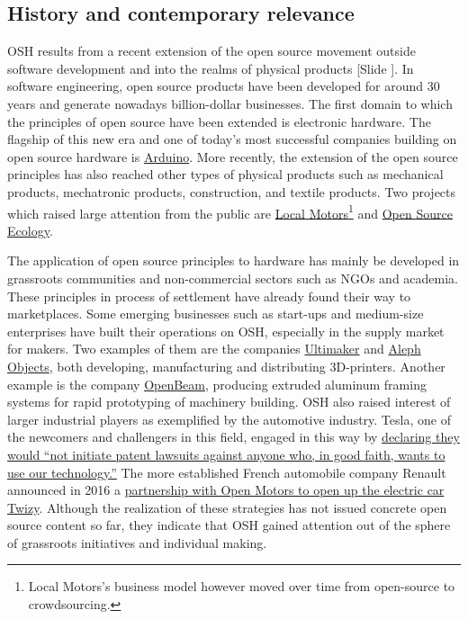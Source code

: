 \documentclass{article}
\newcounter{slide}
\begin{document}
\subsection{History and contemporary relevance}
\label{sec:OSHhistory}
OSH results from a recent extension of the open source movement outside software development and into the realms of physical products {\color{blue}[Slide ]}. In software engineering, open source products have been developed for around 30 years and generate nowadays billion-dollar businesses. The first domain to which the principles of open source have been extended is electronic hardware. The flagship of this new era and one of today's most successful companies building on open source hardware is \href{https://www.arduino.cc/}{Arduino}. More recently, the extension of the open source principles has also reached other types of physical products such as mechanical products, mechatronic products, construction, and textile products. Two projects which raised large attention from the public are \href{https://localmotors.com/}{Local Motors}\footnote{Local Motors's business model however moved over time from open-source to crowdsourcing.} and \href{https://www.opensourceecology.org/}{Open Source Ecology}. 

The application of open source principles to hardware has mainly be developed in grassroots communities and non-commercial sectors such as NGOs and academia. These principles in process of settlement have already found their way to marketplaces. Some emerging businesses such as start-ups and medium-size enterprises have built their operations on OSH, especially in the supply market for makers. Two examples of them are the companies \href{https://ultimaker.com/}{Ultimaker} and \href{https://www.alephobjects.com/}{Aleph Objects}, both developing, manufacturing and distributing 3D-printers. Another example is the company \href{https://ztautomations.com/openbeam/}{OpenBeam}, producing extruded aluminum framing systems for rapid prototyping of machinery building. OSH also raised interest of larger industrial players as exemplified by the automotive industry. Tesla, one of the newcomers and challengers in this field, engaged in this way by \href{https://www.tesla.com/blog/all-our-patent-are-belong-you}{declaring they would ``not initiate patent lawsuits against anyone who, in good faith, wants to use our technology.''} The more established French automobile company Renault announced in 2016 a \href{https://www.openmotors.co/renaultpomsignup/}{partnership with Open Motors to open up the electric car Twizy}. Although the realization of these strategies has not issued concrete open source content so far, they indicate that OSH gained attention out of the sphere of grassroots initiatives and individual making.
\end{document}

